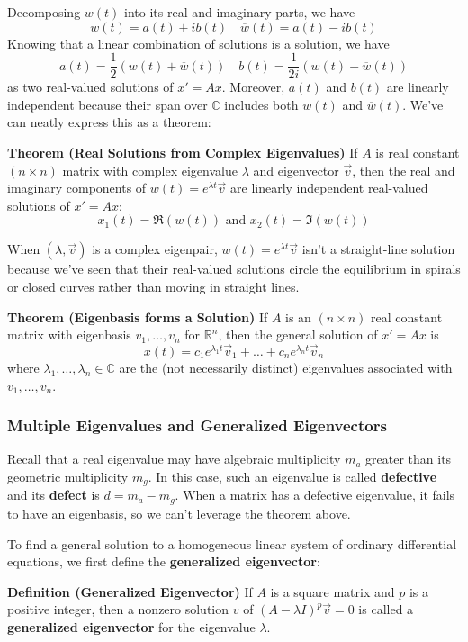 \documentclass[12pt]{article}
\newcommand{\R}{\mathbb{R}}
\newcommand{\C}{\mathbb{C}}
\begin{document}
Decomposing $w(t)$ into its real and imaginary parts, we have $$w(t) = a(t) + ib(t) \quad \overline{w}(t) = a(t) - ib(t)$$ Knowing that a linear combination of solutions is a solution, we have $$a(t) = \frac{1}{2}\left(w(t) + \overline{w}(t)\right) \quad b(t) = \frac{1}{2i}\left(w(t) - \overline{w}(t) \right) $$ as two real-valued solutions of $x' = Ax$. Moreover, $a(t)$ and $b(t)$ are linearly independent because their span over $\C$ includes both $w(t)$ and $\overline{w}(t)$. We've can neatly express this as a theorem:

\textbf{Theorem (Real Solutions from Complex Eigenvalues)} If $A$ is real constant $(n \times n)$ matrix with complex eigenvalue $\lambda$ and eigenvector $\vec{v}$, then the real and imaginary components of $w(t) = e^{\lambda t}\vec{v}$ are linearly independent real-valued solutions of $x' = Ax$: $$x_1(t) = \Re(w(t))\text{ and } x_2(t) = \Im(w(t))$$

When $(\lambda, \vec{v})$ is a complex eigenpair, $w(t) = e^{\lambda t}\vec{v}$ isn't a straight-line solution because we've seen that their real-valued solutions circle the equilibrium in spirals or closed curves rather than moving in straight lines.

\textbf{Theorem (Eigenbasis forms a Solution)} If $A$ is an $(n \times n)$ real constant matrix with eigenbasis $v_1, \ldots, v_n$ for $\R^n$, then the general solution of $x' = Ax$ is $$x(t) = c_1e^{\lambda_1 t}\vec{v}_1 + \ldots + c_ne^{\lambda_n t}\vec{v}_n$$ where $\lambda_1, \ldots, \lambda_n \in \C$ are the (not necessarily distinct) eigenvalues associated with $v_1, \ldots, v_n$.

\subsubsection{Multiple Eigenvalues and Generalized Eigenvectors}

Recall that a real eigenvalue may have algebraic multiplicity $m_a$ greater than its geometric multiplicity $m_g$. In this case, such an eigenvalue is called \textbf{defective} and its \textbf{defect} is $d = m_a - m_g$. When a matrix has a defective eigenvalue, it fails to have an eigenbasis, so we can't leverage the theorem above. %

To find a general solution to a homogeneous linear system of ordinary differential equations, we first define the \textbf{generalized eigenvector}:

\textbf{Definition (Generalized Eigenvector)} If $A$ is a square matrix and $p$ is a positive integer, then a nonzero solution $v$ of $(A - \lambda I)^p\vec{v} = 0$ is called a \textbf{generalized eigenvector} for the eigenvalue $\lambda$.
\end{document}
